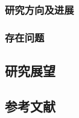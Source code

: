\subsubsection{研究方向及进展}

\subsubsection{存在问题}

\subsection{研究展望}

\subsection{参考文献}


{\normalfont{}\setlength{\baselineskip}{14pt}
\renewcommand{\refname}{\vspace{-\baselineskip}}
}